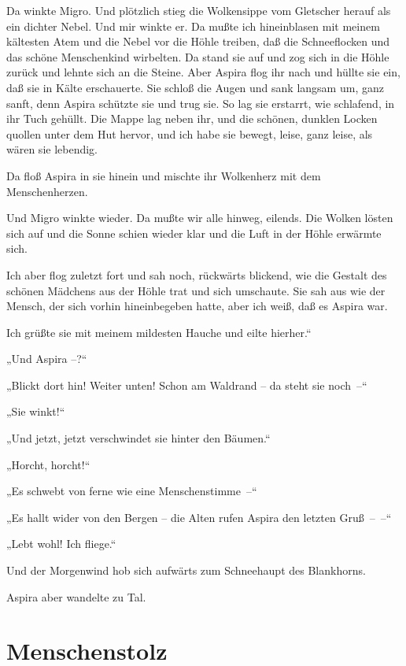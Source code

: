 Da winkte Migro. Und plötzlich stieg die Wolkensippe vom Gletscher
herauf als ein dichter Nebel. Und mir winkte er. Da mußte ich
hineinblasen mit meinem kältesten Atem und die Nebel vor die Höhle
treiben, daß die Schneeflocken und das schöne Menschenkind
wirbelten. Da stand sie auf und zog sich in die Höhle zurück und
lehnte sich an die Steine. Aber Aspira flog ihr nach und hüllte sie
ein, daß sie in Kälte erschauerte. Sie schloß die Augen und sank
langsam um, ganz sanft, denn Aspira schützte sie und trug sie. So
lag sie erstarrt, wie schlafend, in ihr Tuch gehüllt. Die Mappe lag
neben ihr, und die schönen, dunklen Locken quollen unter dem Hut
hervor, und ich habe sie bewegt, leise, ganz leise, als wären sie
lebendig.

Da floß Aspira in sie hinein und mischte ihr Wolkenherz mit dem
Menschenherzen.

Und Migro winkte wieder. Da mußte wir alle hinweg, eilends. Die
Wolken lösten sich auf und die Sonne schien wieder klar und die
Luft in der Höhle erwärmte sich.

Ich aber flog zuletzt fort und sah noch, rückwärts blickend, wie
die Gestalt des schönen Mädchens aus der Höhle trat und sich
umschaute. Sie sah aus wie der Mensch, der sich vorhin
hineinbegeben hatte, aber ich weiß, daß es Aspira war.

Ich grüßte sie mit meinem mildesten Hauche und eilte hierher.“

„Und Aspira –?“

„Blickt dort hin! Weiter unten! Schon am Waldrand – da steht sie
noch~–“

„Sie winkt!“

„Und jetzt, jetzt verschwindet sie hinter den Bäumen.“

„Horcht, horcht!“

„Es schwebt von ferne wie eine Menschenstimme~–“

„Es hallt wider von den Bergen – die Alten rufen Aspira den letzten
Gruß~–~–“

„Lebt wohl! Ich fliege.“

Und der Morgenwind hob sich aufwärts zum Schneehaupt des
Blankhorns.

Aspira aber wandelte zu Tal.

\section{Menschenstolz \ausaspirastagebuch}


